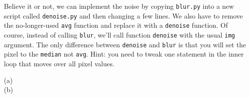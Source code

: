 \documentclass[titlepage]{tufte-book}
\begin{document}
Believe it or not, we can implement the noise by copying {\tt blur.py} into a new script called {\tt denoise.py} and then changing a few lines.  We also have to remove the  no-longer-used {\tt avg} function and replace it with a {\tt denoise} function.  Of course, instead of calling {\tt blur}, we'll call function {\tt denoise} with the usual {\tt img} argument. The only difference between {\tt denoise} and {\tt blur} is that you will set the pixel to the {\tt median} not {\tt avg}.  Hint: you need to tweak one statement in the inner loop that moves over all pixel values.

\begin{marginfigure}
\begin{center}
(a) \\
(b) \\

\end{center}
\end{marginfigure}
\end{document}
